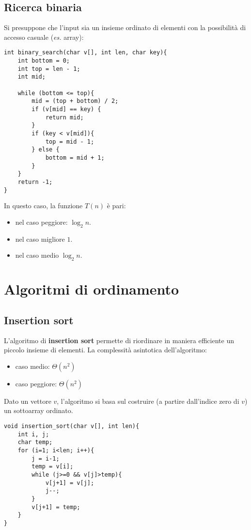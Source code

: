 \subsection{Ricerca binaria}
Si presuppone che l'input sia un insieme ordinato di elementi con la possibilità di accesso casuale (\textit{es.} array):
\begin{lstlisting}[title={Ricerca binaria}]
int binary_search(char v[], int len, char key){
    int bottom = 0;
    int top = len - 1;
    int mid;

    while (bottom <= top){
        mid = (top + bottom) / 2;
        if (v[mid] == key) {
            return mid;
        }
        if (key < v[mid]){
            top = mid - 1;
        } else {
            bottom = mid + 1;
        }
    }
    return -1;
}
\end{lstlisting}
In questo caso, la funzione $T(n)$ è pari:
\begin{itemize}[noitemsep, nolistsep]
	\item nel caso peggiore: $\log_2n$.
	\item nel caso migliore $1$.
	\item nel caso medio $\log_2n$.
\end{itemize}

\section{Algoritmi di ordinamento}

\subsection{Insertion sort}
L'algoritmo di \textbf{insertion sort} permette di riordinare in maniera efficiente un piccolo insieme di elementi.
La complessità asintotica dell'algoritmo:
\begin{itemize}[noitemsep, nolistsep]
	\item caso medio: $\varTheta(n^2)$
	\item caso peggiore: $\varTheta(n^2)$
\end{itemize}
Dato un vettore $v$, l'algoritmo si basa sul costruire (a partire dall'indice zero di $v$) un sottoarray ordinato.
\begin{lstlisting}[title={Insertion sort}]
void insertion_sort(char v[], int len){
    int i, j;
    char temp;
    for (i=1; i<len; i++){
        j = i-1;
        temp = v[i];
        while (j>=0 && v[j]>temp){
            v[j+1] = v[j];
            j--;
        }
        v[j+1] = temp;
    }
}
\end{lstlisting}


